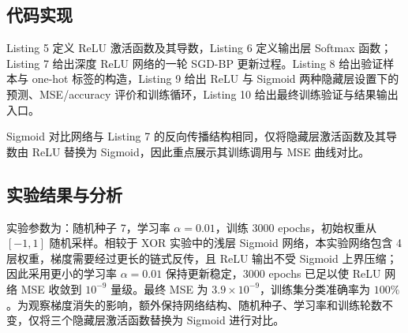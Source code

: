\documentclass[10.5pt]{config}
\begin{document}
\subsection{代码实现}

Listing 5 定义 ReLU 激活函数及其导数，Listing 6 定义输出层 Softmax 函数；Listing 7 给出深度 ReLU 网络的一轮 SGD-BP 更新过程。Listing 8 给出验证样本与 one-hot 标签的构造，Listing 9 给出 ReLU 与 Sigmoid 两种隐藏层设置下的预测、MSE/accuracy 评价和训练循环，Listing 10 给出最终训练验证与结果输出入口。

Sigmoid 对比网络与 Listing 7 的反向传播结构相同，仅将隐藏层激活函数及其导数由 ReLU 替换为 Sigmoid，因此重点展示其训练调用与 MSE 曲线对比。







\clearpage



\clearpage



\clearpage



\subsection{实验结果与分析}

实验参数为：随机种子 7，学习率 $\alpha=0.01$，训练 3000 epochs，初始权重从 $[-1,1]$ 随机采样。相较于 XOR 实验中的浅层 Sigmoid 网络，本实验网络包含 4 层权重，梯度需要经过更长的链式反传，且 ReLU 输出不受 Sigmoid 上界压缩；因此采用更小的学习率 $\alpha=0.01$ 保持更新稳定，3000 epochs 已足以使 ReLU 网络 MSE 收敛到 $10^{-9}$ 量级。最终 MSE 为 $3.9\times10^{-9}$，训练集分类准确率为 $100\%$。为观察梯度消失的影响，额外保持网络结构、随机种子、学习率和训练轮数不变，仅将三个隐藏层激活函数替换为 Sigmoid 进行对比。
\end{document}
